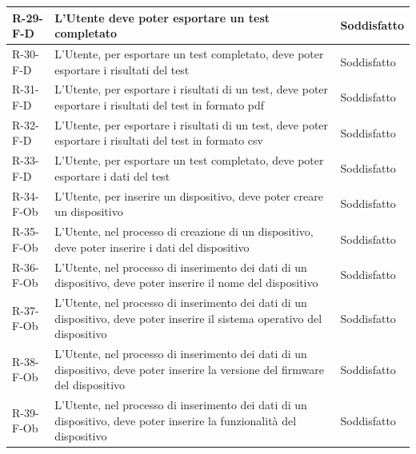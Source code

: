 \documentclass[a4paper,12pt]{article}
\begin{document}
{{\begin{longtable}{|l|p{}|p{}|}
                R-29-F-D        & L'Utente deve poter esportare un test completato                                                                                                                                            & Soddisfatto \\ \hline
                R-30-F-D        & L'Utente, per esportare un test completato, deve poter esportare i risultati del test   & Soddisfatto \\ \hline
                R-31-F-D        & L'Utente, per esportare i risultati di un test, deve poter esportare i risultati del test in formato pdf   & Soddisfatto \\ \hline
                R-32-F-D        & L'Utente, per esportare i risultati di un test, deve poter esportare i risultati del test in formato csv   & Soddisfatto \\ \hline
                R-33-F-D        & L'Utente, per esportare un test completato, deve poter esportare i dati del test   & Soddisfatto \\ \hline
                R-34-F-Ob       & L'Utente, per inserire un dispositivo, deve poter creare un dispositivo                                                                                                                     & Soddisfatto \\ \hline
                R-35-F-Ob       & L'Utente, nel processo di creazione di un dispositivo, deve poter inserire i dati del dispositivo                                                                                           & Soddisfatto \\ \hline
                R-36-F-Ob       & L'Utente, nel processo di inserimento dei dati di un dispositivo, deve poter inserire il nome del dispositivo                                                                               & Soddisfatto \\ \hline
                R-37-F-Ob       & L'Utente, nel processo di inserimento dei dati di un dispositivo, deve poter inserire il sistema operativo del dispositivo                                                                  & Soddisfatto \\ \hline
                R-38-F-Ob       & L'Utente, nel processo di inserimento dei dati di un dispositivo, deve poter inserire la versione del firmware del dispositivo                                                              & Soddisfatto \\ \hline
                R-39-F-Ob       & L'Utente, nel processo di inserimento dei dati di un dispositivo, deve poter inserire la funzionalità del dispositivo                                                                       & Soddisfatto \\ \hline

\end{longtable}}}
\end{document}
